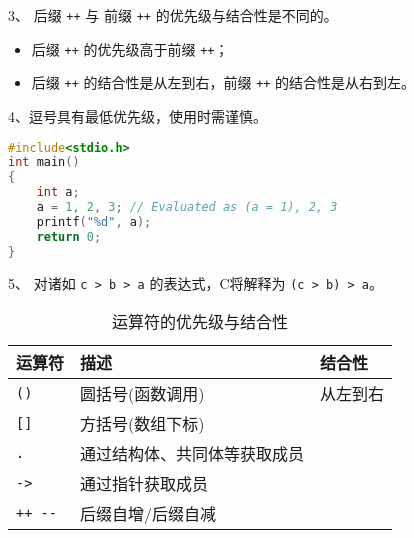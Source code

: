 \begin{frame}[fragile]\ft{\secname}  
3、 后缀 \lstinline|++| 与 前缀 \lstinline|++| 的优先级与结合性是不同的。
\vspace{.1in}

\begin{itemize}
\item 后缀 \lstinline|++| 的优先级高于前缀 \lstinline|++|； \\[.1in]
\item 后缀 \lstinline|++| 的结合性是从左到右，前缀 \lstinline|++| 的结合性是从右到左。
\end{itemize}
\end{frame}

\begin{frame}[fragile]\ft{\secname}  
4、逗号具有最低优先级，使用时需谨慎。
  \begin{lstlisting}[language=c,backgroundcolor=\color{red!10}]
#include<stdio.h> 
int main()
{
    int a;
    a = 1, 2, 3; // Evaluated as (a = 1), 2, 3
    printf("%d", a);
    return 0;
}    
  \end{lstlisting}
\end{frame}

\begin{frame}[fragile]\ft{\secname}  
5、 对诸如 \lstinline|c > b > a| 的表达式，C将解释为 \lstinline|(c > b) > a|。

\end{frame}

\begin{frame}[fragile]\ft{\secname}  

\begin{table}[htbp]
  \centering 
  \caption{运算符的优先级与结合性}
  \begin{tabular}{l|l|l}\hline\hline
    运算符 & 描述 & 结合性 \\\hline
    \lstinline|()| & 圆括号(函数调用) & 从左到右\\[.1in]
    \lstinline|[]| & 方括号(数组下标)&  \\[.1in]
    \lstinline|.| & 通过结构体、共同体等获取成员&  \\[.1in]
    \lstinline|->| & 通过指针获取成员&  \\[.1in]
    \lstinline|++ --| & 后缀自增/后缀自减&  \\\hline
 \end{tabular}
\end{table}    
\end{frame}

